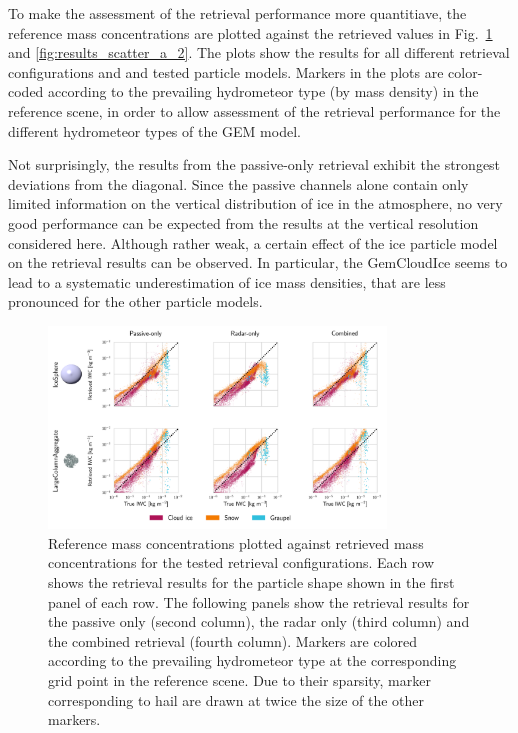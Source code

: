 \documentclass[journal abbreviation, manuscript]{copernicus}
\begin{document}
To make the assessment of the retrieval performance more quantitiave, the
reference mass concentrations are plotted against the retrieved values in
Fig.~\ref{fig:results_scatter_a_1} and \ref{fig:results_scatter_a_2}. The plots
show the results for all different retrieval configurations and and tested
particle models. Markers in the plots are color-coded according to the
prevailing hydrometeor type (by mass density) in the reference scene, in order
to allow assessment of the retrieval performance for the different hydrometeor
types of the GEM model.

Not surprisingly, the results from the passive-only retrieval exhibit the
strongest deviations from the diagonal. Since the passive channels alone contain
only limited information on the vertical distribution of ice in the atmosphere,
no very good performance can be expected from the results at the vertical
resolution considered here. Although rather weak, a certain effect of the 
ice particle model on the retrieval results can be observed. In particular, the
GemCloudIce seems to lead to a systematic underestimation of ice mass densities,
that are less pronounced for the other particle models.

\begin{figure}
\centering
\includegraphics[width = 0.8\textwidth]{../plots/results_scatter_a_1}
\caption{Reference mass concentrations plotted against retrieved mass
  concentrations for the tested retrieval configurations. Each row shows the
  retrieval results for the particle shape shown in the first panel of each row.
  The following panels show the retrieval results for the passive only (second
  column), the radar only (third column) and the combined retrieval (fourth
  column). Markers are colored according to the prevailing hydrometeor type at
  the corresponding grid point in the reference scene. Due to their sparsity,
  marker corresponding to hail are drawn at twice the size of the other
  markers.}
\label{fig:results_scatter_a_1}
\end{figure}
\end{document}
